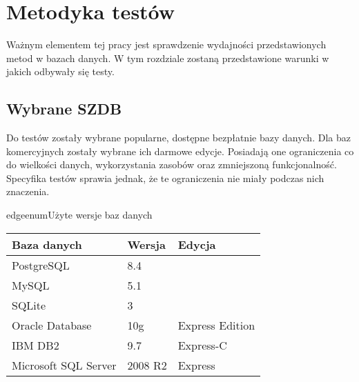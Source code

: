 \chapter{Metodyka testów}

Ważnym elementem tej pracy jest sprawdzenie wydajności przedstawionych metod w bazach danych.
W tym rozdziale zostaną przedstawione warunki w jakich odbywały się testy.

\section*{Wybrane SZDB}

Do testów zostały wybrane popularne, dostępne bezpłatnie bazy danych. 
Dla baz komercyjnych zostały wybrane ich darmowe edycje. 
Posiadają one ograniczenia co do wielkości danych, wykorzystania zasobów oraz zmniejszoną funkcjonalność. 
Specyfika testów sprawia jednak, że te ograniczenia nie miały podczas nich znaczenia.





\begin{qxtab}{edgeenum}{Użyte wersje baz danych}
\begin{tabular}{l|l|l}
Baza danych                            & Wersja & Edycja \\
\hline
PostgreSQL\index{PostgreSQL}           &  8.4      & \\
MySQL\index{MySQL}                     &  5.1      & \\
SQLite\index{SQLite}                   &  3        & \\
Oracle Database\index{Oracle}          &  10g      & Express Edition \\
IBM DB2\index{IBM DB2}                 &  9.7      & Express-C \\
Microsoft SQL Server\index{SQL Server} &  2008 R2  & Express\\
\end{tabular}
\end{qxtab}

